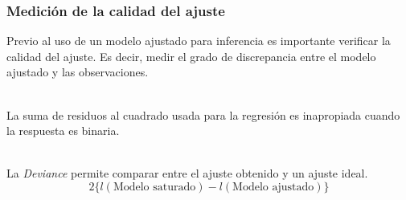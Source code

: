 \documentclass[]{beamer}
\begin{document}
\begin{frame}
    \frametitle{Medición de la calidad del ajuste}

    Previo al uso de un modelo ajustado para  inferencia es importante verificar la calidad del ajuste.
    Es decir, medir el grado de discrepancia entre el modelo ajustado y las observaciones.\\~\  

    La suma de residuos al cuadrado usada para la regresión es inapropiada cuando la respuesta es binaria.\\~\  

    La \textit{Deviance} permite comparar entre el ajuste obtenido y un ajuste ideal.
    $$2\{l(\mbox{Modelo saturado})-l(\mbox{Modelo ajustado})\}$$



\end{frame}
\end{document}
